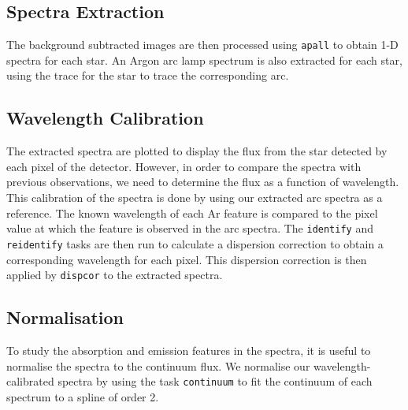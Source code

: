 
\subsection{Spectra Extraction}
\label{cha:InfraredDataReductionTechniques:sec:SpectroscopyData:subsec:SpectraExtraction}

The background subtracted images are then processed using
\texttt{apall} to obtain 1-D spectra for each star. An Argon arc lamp spectrum is also extracted for
each star, using the trace for the star to trace the corresponding arc. %


\subsection{Wavelength Calibration}
\label{cha:InfraredDataReductionTechniques:sec:SpectroscopyData:subsec:WavelengthCalibration}

The extracted spectra are plotted to display the flux from the star
detected by each pixel of the detector. However, in order to compare
the spectra with previous observations, we need to determine the
flux as a function of wavelength. This calibration of the spectra is
done by using our extracted arc spectra as a reference. The known
wavelength of each Ar feature is compared to the pixel value at which
the feature is observed in the arc spectra. The \texttt{identify} and \texttt{reidentify} tasks are
then run to calculate a dispersion correction to obtain a
corresponding wavelength for each pixel. This dispersion correction is then applied by \texttt{dispcor} to the extracted spectra. %


\subsection{Normalisation}
\label{cha:InfraredDataReductionTechniques:sec:SpectroscopyData:subsec:Normalisation}

To study the absorption and emission features in the spectra, it is useful to normalise the spectra to the continuum flux. We normalise our
wavelength-calibrated spectra by using the task \texttt{continuum} to
fit the continuum of each spectrum to a spline of order 2. %


